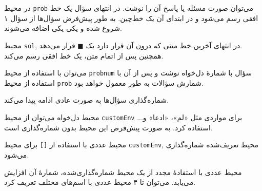 \begin{prob}
	در محیط
	\texttt{prob}
	می‌توان صورت مسئله یا پاسخ آن را نوشت.  در انتهای سؤال یک خط افقی رسم می‌شود و در ابتدای آن یک خط‌چین. به طور پیش‌فرض سؤال‌ها از سؤال ۱ شروع شده و یکی یکی اضافه می‌شوند.
	
\end{prob}
\begin{sol}
	محیط
	\texttt{sol},
	در انتهای آخرین خط متنی که درون آن قرار دارد یک 
	$ \blacksquare $
	قرار می‌دهد.\\	
	همچنین پس از اتمام متن، یک خط افقی رسم می‌کند.
\end{sol}
\begin{probnum}{10}
	می‌توان با استفاده از محیط
	\texttt{probnum}
	سؤال با شمارهٔ دل‌خواه نوشت و پس از آن با استفاده از محیط 
	\texttt{prob}
	شمارش سؤالات به طور معمول خواهد بود.
	
\end{probnum}

\begin{prob}
	شماره‌گذاری سؤال‌ها به صورت عادی ادامه پیدا می‌کند.
	
\end{prob}
\begin{customEnv}{محیط دل‌خواه}
	می‌توان از محیط
	\texttt{customEnv}
	برای مواردی مثل «لم»، «ادعا» و... استفاده کرد. به صورت پیش‌فرض این محیط بدون شماره‌گذاری است.
\end{customEnv}
\begin{customEnv}[]{محیط عددی}
	با استفاده از
	\texttt{[]}
	برای محیط
	\texttt{customEnv},
	محیط تعریف‌شده شماره‌گذاری می‌شود.
\end{customEnv}
\begin{customEnv}[]{محیط عددی}
	با استفادهٔ مجدد از یک محیط شماره‌گذاری‌شده، شمارهٔ آن افزایش می‌یابد. ‌می‌توان تا ۴ محیط عددی با اسم‌های مختلف تعریف کرد.
\end{customEnv}